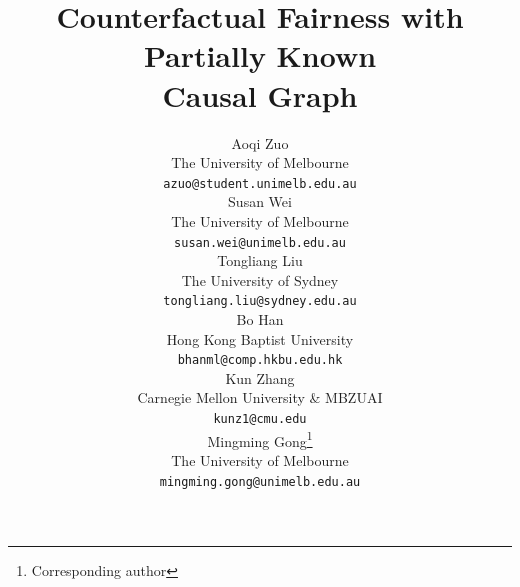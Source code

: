 \documentclass{article}
\title{Counterfactual Fairness with Partially Known \\ Causal Graph}
\author{%
  Aoqi Zuo \\
   The University of Melbourne\\
  \texttt{azuo@student.unimelb.edu.au} \\
   \And
   Susan Wei \\
   The University of Melbourne \\
   \texttt{susan.wei@unimelb.edu.au} \\
   \AND
   Tongliang Liu \\
   The University of Sydney \\
   \texttt{tongliang.liu@sydney.edu.au} \\
   \And
   Bo Han \\
   Hong Kong Baptist University \\
   \texttt{bhanml@comp.hkbu.edu.hk} \\
   \And
   Kun Zhang \\
   Carnegie Mellon University \& MBZUAI \\
   \texttt{kunz1@cmu.edu} \\
   \And
   Mingming Gong\thanks{Corresponding author} \\
   The University of Melbourne \\
   \texttt{mingming.gong@unimelb.edu.au} \\
}
\begin{document}
%

\maketitle

\begin{abstract}



\end{abstract}
\end{document}
